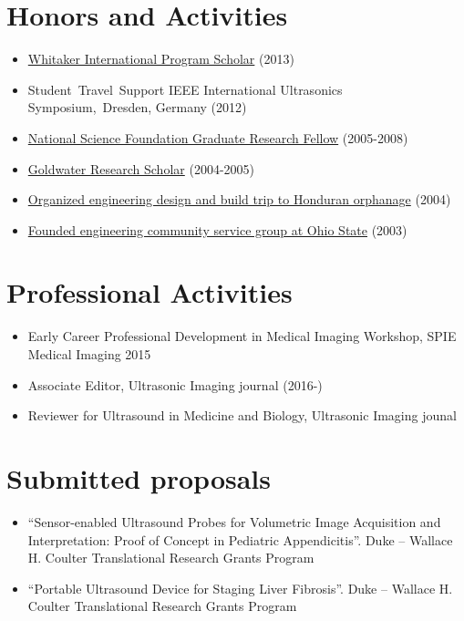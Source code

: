 \documentclass[letterpaper,10pt,english]{sphinxmanual}
\begin{document}
\section{Honors and Activities}
\label{resume:honors-and-activities}\begin{itemize}
\item {} 
\href{http://www.whitaker.org/grants/fellows-scholars}{Whitaker International Program
Scholar} (2013)

\item {} 
Student Travel Support IEEE International Ultrasonics
Symposium, Dresden, Germany (2012)

\item {} 
\href{http://www.nsfgrfp.org/}{National Science Foundation Graduate Research
Fellow} (2005-2008)

\item {} 
\href{https://goldwater.scholarsapply.org/}{Goldwater Research Scholar}
(2004-2005)

\item {} 
\href{http://www.montanadeluz.org/}{Organized engineering design and build trip to Honduran
orphanage} (2004)

\item {} 
\href{http://ecos.osu.edu/}{Founded engineering community service group at Ohio
State} (2003)

\end{itemize}


\section{Professional Activities}
\label{resume:professional-activities}\begin{itemize}
\item {} 
Early Career Professional Development in Medical Imaging Workshop,
SPIE Medical Imaging 2015

\item {} 
Associate Editor, Ultrasonic Imaging journal (2016-)

\item {} 
Reviewer for Ultrasound in Medicine and Biology, Ultrasonic Imaging
jounal

\end{itemize}


\section{Submitted proposals}
\label{resume:submitted-proposals}\begin{itemize}
\item {} 
``Sensor-enabled Ultrasound Probes for Volumetric Image Acquisition
and Interpretation: Proof of Concept in Pediatric Appendicitis''. Duke
– Wallace H. Coulter Translational Research Grants Program

\item {} 
``Portable Ultrasound Device for Staging Liver Fibrosis''. Duke –
Wallace H. Coulter Translational Research Grants Program

\end{itemize}
\end{document}

